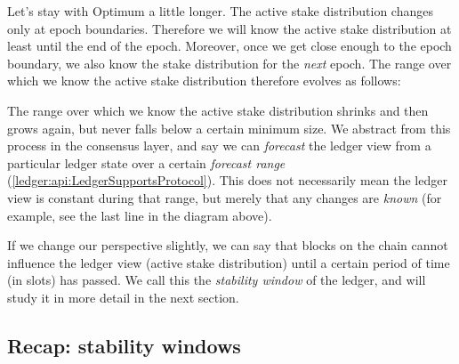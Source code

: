 Let's stay with Optimum a little longer. The active stake distribution changes
only at epoch boundaries. Therefore we will know the active stake distribution
at least until the end of the epoch.  Moreover, once we get close enough to the
epoch boundary, we also know the stake distribution for the \emph{next} epoch.
The range over which we know the active stake distribution therefore evolves as
follows:
%
\begin{center}
\end{center}

\pagebreak

The range over which we know the active stake distribution shrinks and then
grows again, but never falls below a certain minimum size. We abstract from this
process in the consensus layer, and say we can \emph{forecast} the ledger view
from a particular ledger state over a certain \emph{forecast range}
(\cref{ledger:api:LedgerSupportsProtocol}). This does not necessarily mean the
ledger view is constant during that range, but merely that any changes are
\emph{known} (for example, see the last line in the diagram above).

If we change our perspective slightly, we can say that blocks on the chain
cannot influence the ledger view (active stake distribution) until a certain
period of time (in slots) has passed. We call this the \emph{stability window}
of the ledger, and will study it in more detail in the next section.

\subsection{Recap: stability windows}
\label{low-density:recap-stability-window}

